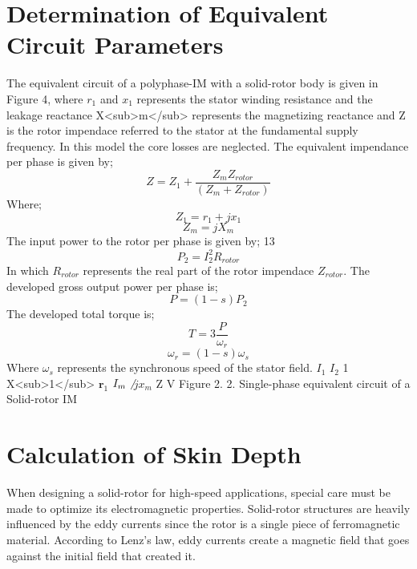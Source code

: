 \section{Determination of Equivalent Circuit Parameters} %

The equivalent circuit of a polyphase-IM with a solid-rotor body is given in Figure
4, where $r_1$ and $x_1$ represents the stator winding resistance and the leakage reactance
X<sub>m</sub> represents the magnetizing reactance and Z is the rotor impendace referred to the
stator at the fundamental supply frequency. In this model the core losses are
neglected.
The equivalent impendance per phase is given by;
%
\begin{equation}\label{eq:2.9}
Z = Z_1 + \frac{Z_m Z_{rotor}}{(Z_m + Z_{rotor})}
\end{equation}
%
Where;
%
\begin{equation}\label{eq:2.10}
Z_1 = r_1 + jx_1
\end{equation}
%
%
\begin{equation}\label{eq:2.11}
Z_m = jX_m
\end{equation}
%
The input power to the rotor per phase is given by;
13
%
\begin{equation}\label{eq:2.12}
P_2 = I_2^2 R_{rotor}
\end{equation}
%
In which $R_{rotor}$ represents the real part of the rotor impendace $Z_{rotor}$. The developed
gross output power per phase is;
%
\begin{equation}\label{eq:2.13}
P=(1-s)P_2
\end{equation}
%
The developed total torque is;
%
\begin{equation}\label{eq:2.14}
T = 3\frac{P}{\omega_r}
\end{equation}
%
%
\begin{equation}\label{eq:2.15}
\omega_r = (1-s)\omega_s
\end{equation}
%
Where $\omega_s$ represents the synchronous speed of the stator field.
$I_1$
$I_2$
1 X<sub>1</sub>
$\mathbf{r}_1$
$I_m \not$
$j x_m $
Z
V
Figure 2. 2. Single-phase equivalent circuit of a Solid-rotor IM

\section{Calculation of Skin Depth} %

When designing a solid-rotor for high-speed applications, special care must be
made to optimize its electromagnetic properties. Solid-rotor structures are heavily
influenced by the eddy currents since the rotor is a single piece of ferromagnetic
material. According to Lenz's law, eddy currents create a magnetic field that goes
against the initial field that created it.

